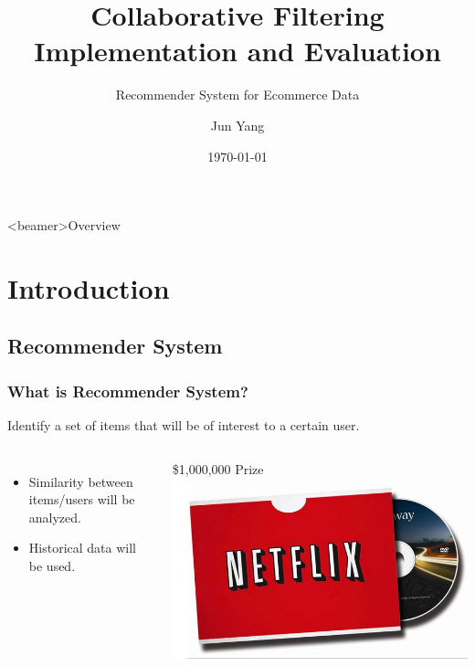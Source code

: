 \documentclass{beamer}
\begin{document}
\title{Collaborative Filtering Implementation and Evaluation}
\subtitle{Recommender System for Ecommerce Data}
\author[Harttle]{Jun Yang}
\date{\today}

\begin{frame}[plain]
  \titlepage
\end{frame}

\begin{frame}<beamer>{Overview}
	\tableofcontents
\end{frame}


\section{Introduction}

\subsection{Recommender System}

\begin{frame}[fragile]
	\frametitle{What is Recommender System?}

    Identify a set of items that will be of interest to a certain user.

    \begin{columns}

        \begin{itemize}
        \item Similarity between items/users will be analyzed.
        \item Historical data will be used.
        \end{itemize}


            \begin{block}{\$1,000,000 Prize}
                \includegraphics[width=\linewidth]{./netflix.png}
            \end{block}

    \end{columns}

\end{frame}
\end{document}
